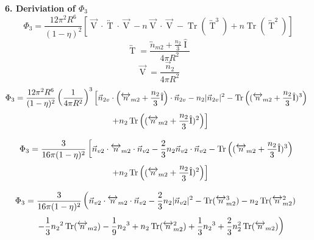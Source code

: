 \documentclass[12pt]{article}
\begin{document}
\[{}\]
\[{}\]
\textbf{6. Deriviation of $\Phi_3$}
\[{}\]
\begin{equation}{\Phi_3=\frac{12\pi^2R^6}{(1-\eta)^2}\left[\overrightarrow{\operatorname{V}}\cdot\overleftrightarrow{\operatorname{T}}\cdot\overrightarrow{\operatorname{V}}-n\overrightarrow{\operatorname{V}}\cdot\overrightarrow{\operatorname{V}}-\operatorname{Tr}\left(\overleftrightarrow{\operatorname{T}}^3\right)+n\operatorname{Tr}\left(\overleftrightarrow{\operatorname{T}}^2\right)\right]}\end{equation}
\[{}\]
\begin{equation}{\overleftrightarrow{\operatorname{T}}=\frac{{\overleftrightarrow{n}_{m2}}+\frac{n_2}{3}\hat{\operatorname{I}}}{4\pi{R}^2}}\end{equation}
\[{}\]
\begin{equation}{\overrightarrow{\operatorname{V}}=\frac{\vec{n}_2}{4\pi{R}^2}}\end{equation}
\[{}\]
\begin{displaymath}{\Phi_3=\frac{12\pi^2R^6}{(1-\eta)^2}\left(\frac{1}{4\pi{R}^2}\right)^3\left[\vec{n}_{2v}\cdot\left({\overleftrightarrow{n}_{m2}}+\frac{n_2}{3}\hat{\operatorname{I}}\right)\cdot\vec{n}_{2v}-n_2|\vec{n}_{2v}|^2-\operatorname{Tr}\left(({\overleftrightarrow{n}_{m2}}+\frac{n_2}{3}\hat{\operatorname{I}})^3\right)\color{white}\right]\color{black}}\end{displaymath}
\begin{equation}{\color{white}\left[\color{black}+n_2\operatorname{Tr}\left(({\overleftrightarrow{n}_{m2}}+\frac{n_2}{3}\hat{\operatorname{I}})^2\right)\right]}\end{equation}
\[{}\]
\begin{displaymath}{\Phi_3=\frac{3}{16\pi(1-\eta)^2}\left[\vec{n}_{v2}\cdot{\overleftrightarrow{n}_{m2}}\cdot{\vec{n}_{v2}}-\frac{2}{3}n_2\vec{n}_{v2}\cdot\vec{n}_{v2}-\operatorname{Tr}\left(({\overleftrightarrow{n}_{m2}}+\frac{n_2}{3}\hat{\operatorname{I}})^3\right)\color{white}\right]\color{black}}\end{displaymath}\begin{equation}{\color{white}\left[\color{black}+n_2\operatorname{Tr}\left((\overleftrightarrow{n}_{m2}+\frac{n_2}{3}\hat{\operatorname{I}})^2\right)\right]}\end{equation}
\[{}\]
\begin{displaymath}{\Phi_3=\frac{3}{16\pi(1-\eta)^2}\left(\vec{n}_{v2}\cdot{\overleftrightarrow{n}_{m2}}\cdot{\vec{n}_{v2}}-\frac{2}{3}n_2|\vec{n}_{v2}|^2-\operatorname{Tr}({\overleftrightarrow{n}_{m2}^3})
-n_2\operatorname{Tr}(\overleftrightarrow{n}_{m2}^2)\color{white}\right)\color{black}}\end{displaymath} \begin{equation}{\color{white}\left(\color{black}-\frac{1}{3}{n_2}^2\operatorname{Tr}(\overleftrightarrow{n}_{m2})-\frac{1}{9}{n_2}^3+n_2\operatorname{Tr}(\overleftrightarrow{n}_{m2}^2)+\frac{1}{3}{n_2}^3+\frac{2}{3}n^2_2\operatorname{Tr}(\overleftrightarrow{n}_{m2})\right)}\end{equation} 
\end{document}
